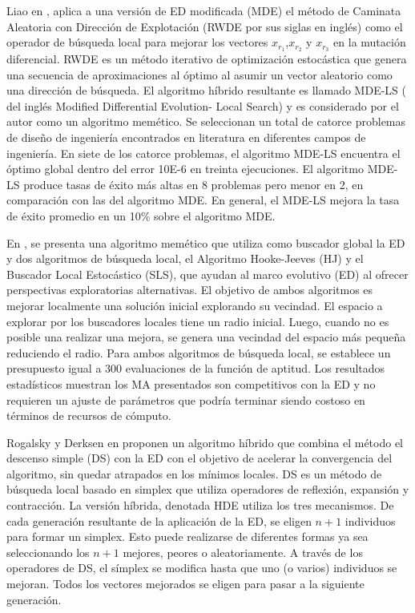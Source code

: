  Liao en \cite{liao2010two}, aplica a una versión de ED modificada (MDE) el método de Caminata Aleatoria con Dirección de Explotación (RWDE por sus siglas en inglés) como el operador de búsqueda local para mejorar los vectores $x_{r_1}$,$x_{r_2}$ y $x_{r_3}$ en la mutación diferencial. RWDE es un método iterativo de optimización estocástica que genera una secuencia de aproximaciones al óptimo al asumir un vector aleatorio como una dirección de búsqueda. El algoritmo híbrido resultante es llamado MDE-LS ( del inglés Modified Differential Evolution- Local Search) y es considerado por el autor como un algoritmo memético. Se seleccionan un total de catorce problemas de diseño de ingeniería encontrados en literatura en diferentes campos de ingeniería. En siete de los catorce problemas, el algoritmo MDE-LS encuentra el óptimo global dentro del error 10E-6 en treinta ejecuciones. El algoritmo MDE-LS produce tasas de éxito más altas en 8 problemas pero menor en 2, en comparación con las del algoritmo MDE. En general, el MDE-LS mejora la tasa de éxito promedio en un 10\% sobre el algoritmo MDE.



En \cite{neri2008memetic}, se presenta una algoritmo memético que utiliza como buscador global la ED y dos algoritmos de búsqueda local, el Algoritmo Hooke-Jeeves (HJ) y el Buscador Local Estocástico (SLS), que ayudan al marco evolutivo (ED) al ofrecer perspectivas exploratorias alternativas. El objetivo de ambos algoritmos es mejorar localmente una solución inicial explorando su vecindad. El espacio a explorar por los buscadores locales tiene un radio inicial. Luego, cuando no es posible una realizar una mejora, se genera una vecindad del espacio más pequeña reduciendo el radio. Para ambos algoritmos de búsqueda local, se establece un presupuesto igual a 300 evaluaciones de la función de aptitud. Los resultados estadísticos muestran los MA presentados son competitivos con la ED y no requieren un ajuste de parámetros que podría terminar siendo costoso en términos de recursos de cómputo. 

Rogalsky y Derksen en \cite{rogalsky2000hybridization} proponen un algoritmo híbrido que combina el método el descenso simple (DS) con la ED con el objetivo de acelerar la convergencia del algoritmo, sin quedar atrapados en los mínimos locales.
DS es un método de búsqueda local basado en simplex que utiliza operadores de reflexión, expansión y contracción. La versión híbrida, denotada HDE utiliza los tres mecanismos.
De cada generación resultante de la aplicación de la ED, se eligen $ n + 1 $ individuos para formar un simplex. Esto puede realizarse de diferentes formas ya sea seleccionando los $n+1$ mejores, peores o aleatoriamente. A través de los operadores de DS, el símplex se modifica hasta que uno (o varios) individuos se mejoran. Todos los vectores mejorados se eligen para pasar a la siguiente generación. 

